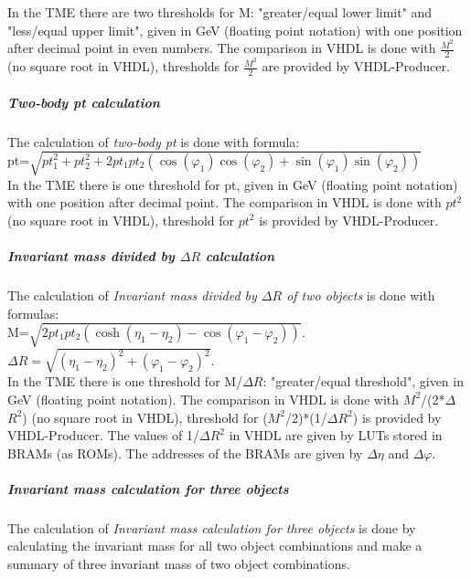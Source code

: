 In the TME there are two thresholds for M: "greater/equal lower limit" and "less/equal upper limit", given in GeV (floating point notation)
with one position after decimal point in even numbers.
The comparison in VHDL is done with $\frac{M^2}{2}$ (no square root in VHDL), thresholds for $\frac{M^2}{2}$ are provided by VHDL-Producer.

\subparagraph{Two-body pt calculation}
\label{sec:gtl:twobody_pt_calculation}

The calculation of \textit{two-body pt} is done with formula:\\

pt=$\sqrt{pt^2_1 + pt^2_2 + 2  pt_1 pt_2 (\cos(\varphi_1) \cos(\varphi_2) + \sin(\varphi_1) \sin(\varphi_2))}$\\

In the TME there is one threshold for pt, given in GeV (floating point notation) with one position after decimal point.
The comparison in VHDL is done with ${pt^2}$ (no square root in VHDL), threshold for ${pt^2}$ is provided by VHDL-Producer.

\subparagraph{Invariant mass divided by $\Delta$$R$ calculation}
\label{sec:gtl:inv_mass_div_dr_calculation}

The calculation of \textit{Invariant mass divided by $\Delta$$R$ of two objects} is done with formulas:\\

M=$\sqrt{2 pt_1  pt_2 (\cosh(\eta_1-\eta_2)-\cos(\varphi_1-\varphi_2))}$.\\

$\Delta$$R=\sqrt{(\eta_1-\eta_2)^2+(\varphi_1-\varphi_2)^2}$.\\

In the TME there is one threshold for M/$\Delta$$R$: "greater/equal threshold", given in GeV (floating point notation).
The comparison in VHDL is done with $M^2$/(2*$\Delta$$R^2$) (no square root in VHDL), threshold for ($M^2$/2)*(1/$\Delta$$R^2$) is provided by VHDL-Producer.
The values of 1/$\Delta$$R^2$ in VHDL are given by LUTs stored in BRAMs (as ROMs). The addresses of the BRAMs are given by $\Delta\eta$ and $\Delta\varphi$.

\subparagraph{Invariant mass calculation for three objects}
\label{sec:gtl:inv_mass_3_obj_calculation}

The calculation of \textit{Invariant mass calculation for three objects} is done by calculating the invariant mass for all two object combinations and make a summary of three invariant mass of two object combinations. 


